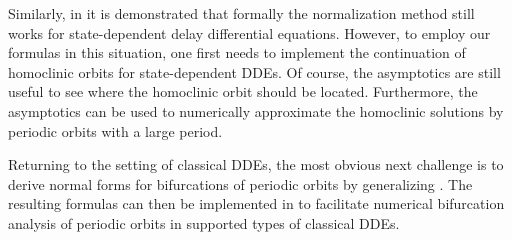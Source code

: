 Similarly, in \cite{Sieber@2017} it is demonstrated that formally the
normalization method still works for state-dependent delay differential
equations. However, to employ our formulas in this situation, one first needs
to implement the continuation of homoclinic orbits for state-dependent DDEs. Of
course, the asymptotics are still useful to see where     the homoclinic orbit
should be located. Furthermore, the asymptotics can be used to numerically
approximate the homoclinic solutions by periodic orbits with a large period.

Returning to the setting of classical DDEs, the most obvious next challenge is
to derive normal forms for bifurcations of periodic orbits by generalizing
\cite{Kuznetsov2005,DeWitte2013,DeWitte2014}. The resulting formulas can then
be implemented in \DDEBIFTOOL to facilitate numerical bifurcation analysis of
periodic orbits in supported types of classical DDEs.
